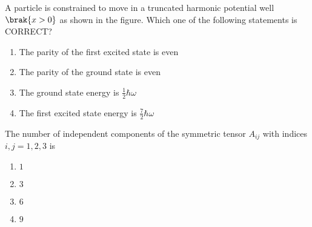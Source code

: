     \item A particle is constrained to move in a truncated harmonic potential well $\brak{x > 0}$ as shown in the 
    figure. Which one of the following statements is CORRECT?
    \begin{figure}[H]
\centering
{}%

\label{fig:my_label}
\end{figure}

    
    \begin{enumerate}
        \item The parity of the first excited state is even 
        \item The parity of the ground state is even 
        \item The ground state energy is $\frac{1}{2} \hbar \omega$
        \item The first excited state energy is $\frac{7}{2} \hbar \omega$
    \end{enumerate}

    \item The number of independent components of the symmetric tensor $A_{ij}$ with indices $i, j = 1, 2, 3$ is
    \begin{multicols}{4}
        \begin{enumerate}
            \item $1$
            \item $3$
            \item $6$
            \item $9$
        \end{enumerate}
    \end{multicols}

